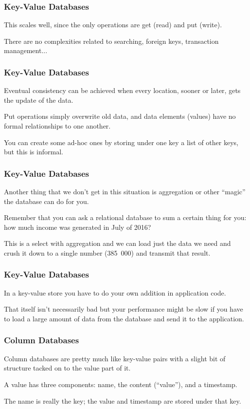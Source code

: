 \begin{frame}
\frametitle{Key-Value Databases}

This scales well, since the only operations are get (read) and put (write). 

There are no complexities related to searching, foreign keys, transaction management...

\end{frame}



\begin{frame}
\frametitle{Key-Value Databases}

Eventual consistency can be achieved when every location, sooner or later, gets the update of the data. 

Put operations simply overwrite old data, and data elements (values) have no formal relationships to one another. 

You can create some ad-hoc ones by storing under one key a list of other keys, but this is informal.


\end{frame}



\begin{frame}
\frametitle{Key-Value Databases}

Another thing that we don't get in this situation is aggregation or other ``magic'' the database can do for you. 

Remember that you can ask a relational database to sum a certain thing for you: how much income was generated in July of 2016? 

This is a select with aggregation and we can load just the data we need and crush it down to a single number (385~000) and transmit that result. 

\end{frame}



\begin{frame}
\frametitle{Key-Value Databases}

In a key-value store you have to do your own addition in application code. 

That itself isn't necessarily bad but your performance might be slow if you have to load a large amount of data from the database and send it to the application. 

\end{frame}


\begin{frame}
\frametitle{Column Databases}

Column databases are pretty much like key-value pairs with a slight bit of structure tacked on to the value part of it. 

A value has three components: name, the content (``value''), and a timestamp. 

The name is really the key; the value and timestamp are stored under that key.

\end{frame}



